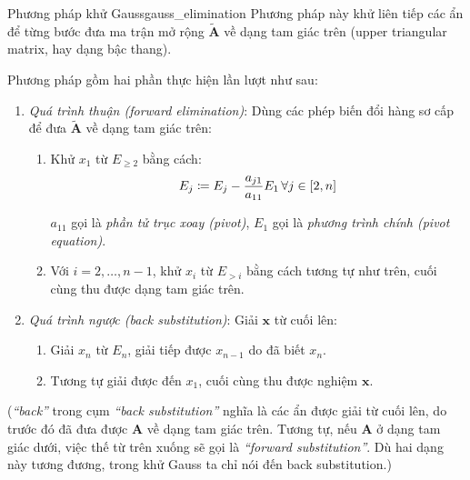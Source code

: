 \documentclass[../../Lectures]{subfiles}
\begin{document}
\begin{cmethod}{Phương pháp khử Gauss}{gauss_elimination}
    Phương pháp này khử liên tiếp các ẩn để từng bước đưa ma trận mở rộng
    \(\bm{\tilde{A}}\) về dạng tam giác trên (upper triangular matrix, hay dạng
    bậc thang).

    Phương pháp gồm hai phần thực hiện lần lượt như sau:

    \begin{enumerate}
        \item \emph{Quá trình thuận (forward elimination)}: Dùng các phép biến
            đổi hàng sơ cấp để đưa \(\bm{\tilde{A}}\) về dạng tam giác trên:
            \begin{enumerate}
                \item Khử \(x_1\) từ \(E_{\geq 2}\) bằng cách:
                    \begin{equation}\label{eq:gauss_elinimation_1st}
                        E_j \coloneqq E_j - \frac{a_{j1}}{a_{11}} E_1 \, \forall j \in \interval{2}{n}
                    \end{equation}

                    \(a_{11}\) gọi là \emph{phần tử trục xoay (pivot)}, \(E_1\)
                    gọi là \emph{phương trình chính (pivot equation)}.

                \item Với \(i = 2, \ldots, n - 1\), khử \(x_i\) từ \(E_{> i}\)
                    bằng cách tương tự như trên, cuối cùng thu được dạng tam
                    giác trên.
            \end{enumerate}

        \item \emph{Quá trình ngược (back substitution)}: Giải \(\bm{x}\) từ
            cuối lên:
            \begin{enumerate}
                \item Giải \(x_n\) từ \(E_n\), giải tiếp được \(x_{n - 1}\) do
                    đã biết \(x_n\).

                \item Tương tự giải được đến \(x_1\), cuối cùng thu được nghiệm
                    \(\bm{x}\).
            \end{enumerate}
    \end{enumerate}
\end{cmethod}

(\emph{``back''} trong cụm \emph{``back substitution''} nghĩa là các ẩn được
giải từ cuối lên, do trước đó đã đưa được \(\bm{A}\) về dạng tam giác trên.
Tương tự, nếu \(\bm{A}\) ở dạng tam giác dưới, việc thế từ trên xuống sẽ gọi là
\emph{``forward substitution''}. Dù hai dạng này tương đương, trong khử Gauss ta
chỉ nói đến back substitution.)
\end{document}
